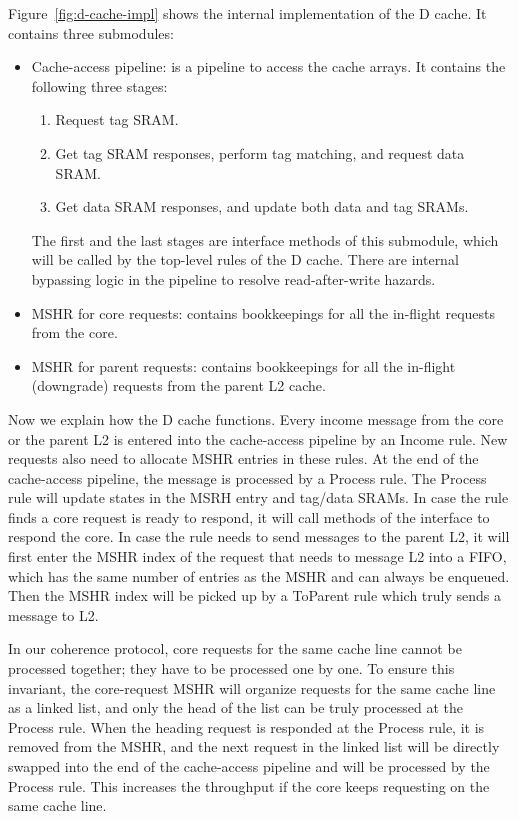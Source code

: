 Figure~\ref{fig:d-cache-impl} shows the internal implementation of the D cache.
It contains three submodules:
\begin{itemize}
    \item Cache-access pipeline: is a pipeline to access the cache arrays.
    It contains the following three stages:
    \begin{enumerate}
        \item Request tag SRAM.
        \item Get tag SRAM responses, perform tag matching, and request data SRAM.
        \item Get data SRAM responses, and update both data and tag SRAMs.
    \end{enumerate}
    The first and the last stages are interface methods of this submodule, which will be called by the top-level rules of the D cache.
    There are internal bypassing logic in the pipeline to resolve read-after-write hazards.
    \item MSHR for core requests: contains bookkeepings for all the in-flight requests from the core.
    \item MSHR for parent requests: contains bookkeepings for all the in-flight (downgrade) requests from the parent L2 cache.
\end{itemize}

Now we explain how the D cache functions.
Every income message from the core or the parent L2 is entered into the cache-access pipeline by an Income rule.
New requests also need to allocate MSHR entries in these rules.
At the end of the cache-access pipeline, the message is processed by a Process rule.
The Process rule will update states in the MSRH entry and tag/data SRAMs.
In case the rule finds a core request is ready to respond, it will call methods of the  interface to respond the core.
In case the rule needs to send messages to the parent L2, it will first enter the MSHR index of the request that needs to message L2 into a FIFO, which has the same number of entries as the MSHR and can always be enqueued.
Then the MSHR index will be picked up by a ToParent rule which truly sends a message to L2.

In our coherence protocol, core requests for the same cache line cannot be processed together; they have to be processed one by one.
To ensure this invariant, the core-request MSHR will organize requests for the same cache line as a linked list, and only the head of the list can be truly processed at the Process rule.
When the heading request is responded at the Process rule, it is removed from the MSHR, and the next request in the linked list will be directly swapped into the end of the cache-access pipeline and will be processed by the Process rule.
This increases the throughput if the core keeps requesting on the same cache line.

